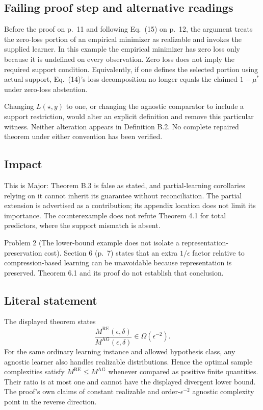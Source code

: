 \documentclass[10pt]{article}
\begin{document}
\subsection*{Failing proof step and alternative readings}
Before the proof on p. 11 and following Eq. (15) on p. 12, the argument treats the zero-loss portion of an empirical minimizer as realizable and invokes the supplied learner. In this example the empirical minimizer has zero loss only because it is undefined on every observation. Zero loss does not imply the required support condition. Equivalently, if one defines the selected portion using actual support, Eq. (14)’s loss decomposition no longer equals the claimed \(1-\mu^\ast\) under zero-loss abstention.\par
Changing \(L(\star,y)\) to one, or changing the agnostic comparator to include a support restriction, would alter an explicit definition and remove this particular witness. Neither alteration appears in Definition B.2. No complete repaired theorem under either convention has been verified.\par
\subsection*{Impact}
This is Major: Theorem B.3 is false as stated, and partial-learning corollaries relying on it cannot inherit its guarantee without reconciliation. The partial extension is advertised as a contribution; its appendix location does not limit its importance. The counterexample does not refute Theorem 4.1 for total predictors, where the support mismatch is absent.\par
Problem 2 (The lower-bound example does not isolate a representation-preservation cost).  Section 6 (p. 7) states that an extra \(1/\epsilon\) factor relative to compression-based learning can be unavoidable because representation is preserved. Theorem 6.1 and its proof do not establish that conclusion.\par
\subsection*{Literal statement}
The displayed theorem states \[\frac{M^{\mathrm{RE}}(\epsilon,\delta)}
     {M^{\mathrm{AG}}(\epsilon,\delta)}
\in\Omega(\epsilon^{-2}).\] For the same ordinary learning instance and allowed hypothesis class, any agnostic learner also handles realizable distributions. Hence the optimal sample complexities satisfy \(M^{\mathrm{RE}}\le M^{\mathrm{AG}}\) whenever compared as positive finite quantities. Their ratio is at most one and cannot have the displayed divergent lower bound. The proof’s own claims of constant realizable and order-\(\epsilon^{-2}\) agnostic complexity point in the reverse direction.\par
\end{document}
